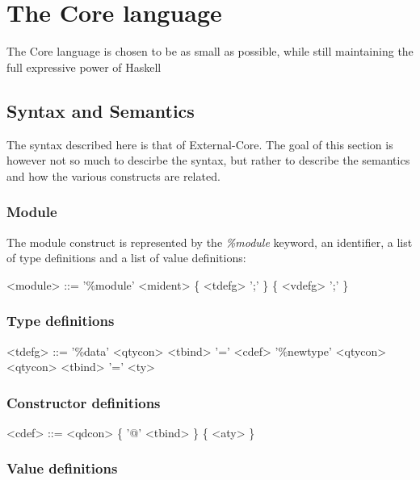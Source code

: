 



\chapter{The Core language}

The Core language is chosen to be as small as possible, while still maintaining 
the full expressive power of Haskell

\section*{Syntax and Semantics}

The syntax described here is that of External-Core. The goal of this section is
however not so much to descirbe the syntax, but rather to describe the semantics and 
how the various constructs are related.

\subsection*{Module}

The module construct is represented by the \emph{\%module} keyword, an identifier,
a list of type definitions and a list of value definitions:

\begin{grammar}
<module> ::= '\%module' <mident> \{ <tdefg> ';' \} \{ <vdefg> ';' \}
\end{grammar}

\subsection*{Type definitions}

\begin{grammar}
<tdefg> ::= '\%data' <qtycon> <tbind> '=' <cdef>
       \alt '\%newtype' <qtycon> <qtycon> <tbind> '=' <ty>
\end{grammar}


\subsection*{Constructor definitions}

\begin{grammar}
<cdef> ::= <qdcon> \{ '@' <tbind> \} \{ <aty> \}
\end{grammar}

\subsection*{Value definitions}

